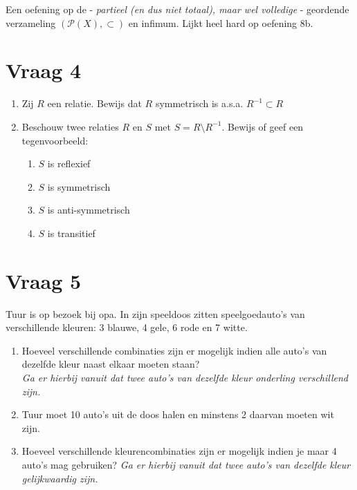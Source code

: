 \documentclass[kulak]{kulakarticle} %
\begin{document}
	Een oefening op de - \textit{partieel (en dus niet totaal), maar wel volledige} - geordende verzameling \((\mathcal{P}(X),\subset)\) en infimum. Lijkt heel hard op oefening 8b.

	\section*{Vraag 4}

	\begin{enumerate}
		\item Zij \(R\) een relatie. Bewijs dat \(R\) symmetrisch is a.s.a. \(R^{-1}\subset R\)
		\item Beschouw twee relaties \(R\) en \(S\) met \(S=R\setminus R^{-1}\). Bewijs of geef een tegenvoorbeeld:
		\begin{enumerate}
			\item \(S\) is reflexief
			\item \(S\) is symmetrisch
			\item \(S\) is anti-symmetrisch
			\item \(S\) is transitief
		\end{enumerate}
	\end{enumerate}

	\newpage

	\section*{Vraag 5}

	Tuur is op bezoek bij opa. In zijn speeldoos zitten speelgoedauto's van verschillende kleuren: 3 blauwe, 4 gele, 6 rode en 7 witte.

	\begin{enumerate}
		\item Hoeveel verschillende combinaties zijn er mogelijk indien alle auto's van dezelfde kleur naast elkaar moeten staan?\\
		\textit{Ga er hierbij vanuit dat twee auto's van dezelfde kleur onderling verschillend zijn.}
		\item Tuur moet 10 auto's uit de doos halen en minstens 2 daarvan moeten wit zijn.
		\item Hoeveel verschillende kleurencombinaties zijn er mogelijk indien je maar 4 auto's mag gebruiken?
		\textit{Ga er hierbij vanuit dat twee auto's van dezelfde kleur gelijkwaardig zijn.}
	\end{enumerate}
\end{document}
